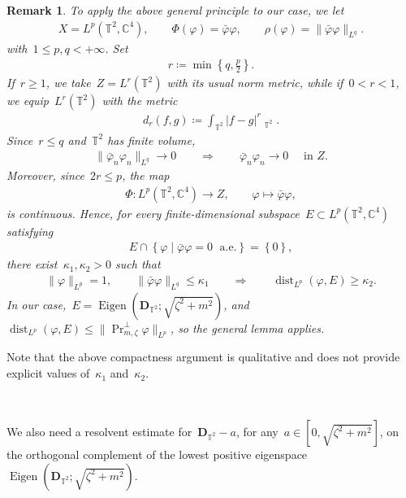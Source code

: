 \documentclass[10pt,a4paper]{amsart}
\newcommand{\C}{\mathbb{C}}
\newcommand{\T}{\mathbb{T}}
\newcommand{\dd}{\mathop{}\!\mathrm{d}}
\newcommand{\pD}{\mathbf{D}}
\newcommand{\braces}[1]{\left\{#1\right\}} %
\DeclareMathOperator{\dist}{dist}
\DeclareMathOperator{\dv}{\dd{vol}}
\DeclareMathOperator{\Eigen}{Eigen}
\DeclareMathOperator{\proj}{Pr}
\newtheorem{rmk}[thm]{Remark}
\begin{document}
\begin{rmk}
    To apply the above general principle to our case, we let
    \begin{align}
        X=L^p(\T^2,\C^4),
        \qquad
        \Phi(\varphi)=\bar{\varphi}\varphi,
        \qquad
        \rho(\varphi)=\|\bar{\varphi}\varphi\|_{L^q}.
    \end{align}
    with~$1\leq p,q<+\infty$. 
    Set
    \begin{align}
        r\coloneqq \min\braces{q,\frac{p}{2}}.
    \end{align}
    If~$r\geq1$, we take~$Z=L^r(\T^2)$ with its usual norm metric, while if~$0<r<1$, we equip~$L^r(\T^2)$ with the metric
    \begin{align}
        d_r(f,g)\coloneqq \int_{\T^2}|f-g|^r\dv_{\T^2}.
    \end{align}
    Since~$r\leq q$ and~$\T^2$ has finite volume,
    \begin{align}
        \|\bar{\varphi}_n\varphi_n\|_{L^q}\to0
        \qquad\Longrightarrow\qquad
        \bar{\varphi}_n\varphi_n\to0
        \quad\mbox{ in }Z.
    \end{align}
    Moreover, since~$2r\leq p$, the map
    \begin{align}
        \Phi\colon L^p(\T^2,\C^4)\to Z,
        \qquad
        \varphi\mapsto\bar{\varphi}\varphi,
    \end{align}
    is continuous.
    Hence, for every finite-dimensional subspace~$E\subset L^p(\T^2,\C^4)$ satisfying
    \begin{align}
        E\cap\braces{\varphi\mid \bar{\varphi}\varphi=0\;\mbox{ a.e.}}=\braces{0},
    \end{align}
    there exist~$\kappa_1,\kappa_2>0$ such that
    \begin{align}
        \|\varphi\|_{L^p}=1,
        \qquad
        \|\bar{\varphi}\varphi\|_{L^q}\leq\kappa_1
        \qquad\Longrightarrow\qquad
        \dist_{L^p}(\varphi,E)\geq\kappa_2.
    \end{align}
    In our case,~$E=\Eigen(\pD_{\T^2};\sqrt{\zeta^2+m^2})$, and~$\dist_{L^p}(\varphi,E)\leq \|\proj_{m,\zeta}^\perp \varphi\|_{L^p}$, so the general lemma applies. 
\end{rmk}
Note that the above compactness argument is qualitative and does not provide explicit values of~$\kappa_1$ and~$\kappa_2$.


\ 

      We also need a resolvent estimate for~$\pD_{\T^2}-a $, for any~$a\in [0,\sqrt{\zeta^2+m^2}]$, on the orthogonal complement of the lowest positive eigenspace~$\Eigen(\pD_{\T^2};\sqrt{\zeta^2+m^2})$.
\end{document}

